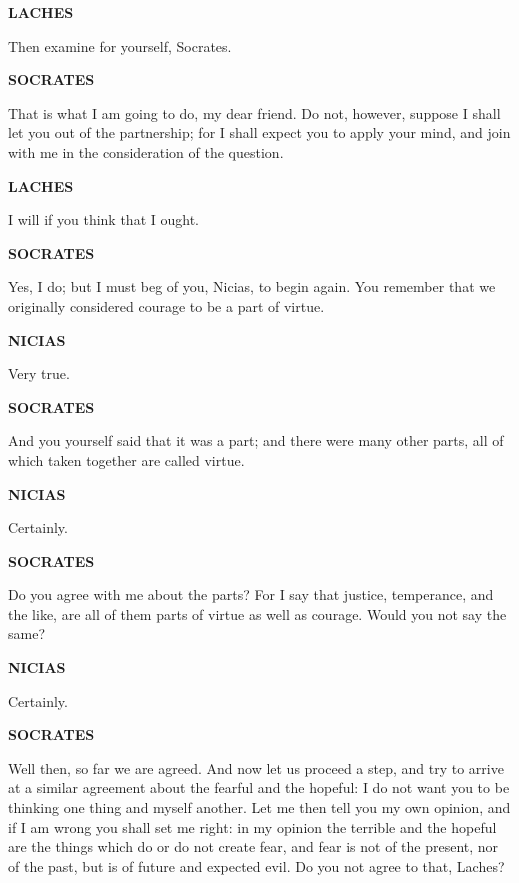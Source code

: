 \documentclass[11pt,letter]{article}
\begin{document}
\par \textbf{LACHES}
\par   Then examine for yourself, Socrates.

\par \textbf{SOCRATES}
\par   That is what I am going to do, my dear friend. Do not, however, suppose I shall let you out of the partnership; for I shall expect you to apply your mind, and join with me in the consideration of the question.

\par \textbf{LACHES}
\par   I will if you think that I ought.

\par \textbf{SOCRATES}
\par   Yes, I do; but I must beg of you, Nicias, to begin again. You remember that we originally considered courage to be a part of virtue.

\par \textbf{NICIAS}
\par   Very true.

\par \textbf{SOCRATES}
\par   And you yourself said that it was a part; and there were many other parts, all of which taken together are called virtue.

\par \textbf{NICIAS}
\par   Certainly.

\par \textbf{SOCRATES}
\par   Do you agree with me about the parts? For I say that justice, temperance, and the like, are all of them parts of virtue as well as courage. Would you not say the same?

\par \textbf{NICIAS}
\par   Certainly.

\par \textbf{SOCRATES}
\par   Well then, so far we are agreed. And now let us proceed a step, and try to arrive at a similar agreement about the fearful and the hopeful:  I do not want you to be thinking one thing and myself another. Let me then tell you my own opinion, and if I am wrong you shall set me right:  in my opinion the terrible and the hopeful are the things which do or do not create fear, and fear is not of the present, nor of the past, but is of future and expected evil. Do you not agree to that, Laches?
\end{document}
